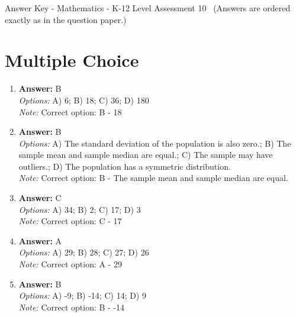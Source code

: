 \documentclass[12pt]{article}
\begin{document}
\begin{center}
Answer Key - Mathematics - K-12 Level Assessment 10 \
\small (Answers are ordered exactly as in the question paper.)
\end{center}

\section*{Multiple Choice}
\begin{enumerate}[label=\arabic*.]
\item \textbf{Answer:} B
\\ \textit{Options:} A) 6; B) 18; C) 36; D) 180
\\ \textit{Note:} Correct option: B - 18
\item \textbf{Answer:} B
\\ \textit{Options:} A) The standard deviation of the population is also zero.; B) The sample mean and sample median are equal.; C) The sample may have outliers.; D) The population has a symmetric distribution.
\\ \textit{Note:} Correct option: B - The sample mean and sample median are equal.
\item \textbf{Answer:} C
\\ \textit{Options:} A) 34; B) 2; C) 17; D) 3
\\ \textit{Note:} Correct option: C - 17
\item \textbf{Answer:} A
\\ \textit{Options:} A) 29; B) 28; C) 27; D) 26
\\ \textit{Note:} Correct option: A - 29
\item \textbf{Answer:} B
\\ \textit{Options:} A) -9; B) -14; C) 14; D) 9
\\ \textit{Note:} Correct option: B - -14
\end{enumerate}
\end{document}
